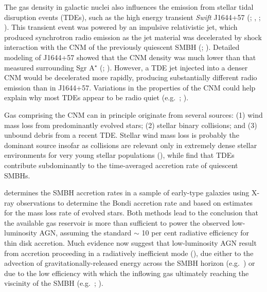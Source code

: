 \documentclass[usenatbib,fleqn]{mn2e}
\newcommand{\Mbh}[1][]{M_{\bullet#1}}
\begin{document}

The gas density in galactic nuclei also influences the emission from
stellar tidal disruption events (TDEs), such as the high energy
transient {\it Swift} J1644+57 (\citealt{Levan+11};
\citealt{Bloom+11}, \citealt{Burrows+11}; \citealt{Zauderer+11}).
This transient event was powered by an impulsive relativistic jet,
which produced synchrotron radio emission as the jet material was
decelerated by shock interaction with the CNM of the previously
quiescent SMBH (\citealt{Giannios&Metzger11}; \citealt{Zauderer+11}).
Detailed modeling of J1644+57 showed that the CNM density was much
lower than that measured surrounding Sgr A$^{\star}$
(\citealt{Metzger+12}; \citealt{BergerZauderer+:2012a}).  However, a TDE jet
injected into a denser CNM would be decelerated more rapidly,
producing substantially different radio emission than in J1644+57.
Variations in the properties of the CNM could help explain why most
TDEs appear to be radio quiet (e.g.~\citealt{Bower+13};
\citealt{VanVelzen+13}).

Gas comprising the CNM can in principle originate from several
sources: (1) wind mass loss from predominantly evolved stars; (2)
stellar binary collisions; and (3) unbound debris from a recent TDE.
Stellar wind mass loss is probably the dominant source insofar as
collisions are relevant only in extremely dense stellar environments
for very young stellar populations (\citealt{Rubin&Loeb11}), while
\citet{MacLeod+13} find that TDEs contribute subdominantly to the
time-averaged accretion rate of quiescent SMBHs.

\citet{Ho:2009a} determines the SMBH accretion rates in a sample of
early-type galaxies using X-ray observations to determine the
Bondi accretion rate and based on estimates for the mass loss rate of
evolved stars.  Both methods lead to the conclusion that the available
gas reservoir is more than sufficient to power the observed
low-luminosity AGN, assuming the standard $\sim$ 10 per cent radiative
efficiency for thin disk accretion.  Much
evidence now suggest that low-luminosity AGN result from accretion
proceeding in a radiatively inefficient mode
(\citealt{Yuan&Narayan14}), due either to the advection of
gravitationally-released energy across the SMBH horizon
(e.g.~\citealt{Narayan&Yi95}) or due to the low efficiency with which the inflowing gas ultimately reaching the viscinity of the SMBH
(e.g.~\citealt{Blandford&Begelman99}; \citealt{Li+13}).
\end{document}
